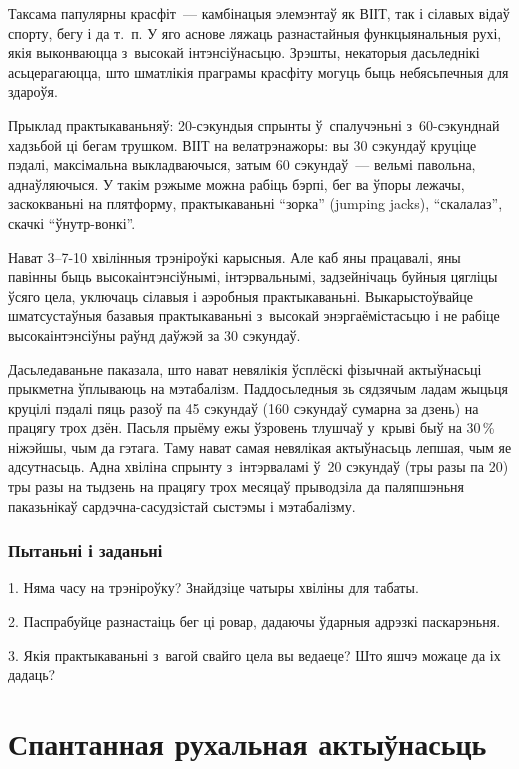 Таксама папулярны красфіт~--- камбінацыя элемэнтаў як ВІІТ, так і сілавых відаў спорту, бегу і да т.~п. У яго аснове ляжаць разнастайныя функцыянальныя рухі, якія выконваюцца з~высокай інтэнсіўнасьцю. Зрэшты, некаторыя дасьледнікі асьцерагаюцца, што шматлікія праграмы красфіту могуць быць небясьпечныя для здароўя.

Прыклад практыкаваньняў: 20-сэкундыя спрынты ў~спалучэньні з~60-сэкунднай хадзьбой ці бегам трушком. ВІІТ на велатрэнажоры: вы 30 сэкундаў круціце пэдалі, максімальна выкладваючыся, затым 60 сэкундаў~--- вельмі павольна, аднаўляючыся. У такім рэжыме можна рабіць бэрпі, бег ва ўпоры лежачы, заскокваньні на плятформу, практыкаваньні ``зорка'' (jumping jacks), ``скалалаз'', скачкі ``ўнутр-вонкі''.

Нават 3--7-10 хвілінныя трэніроўкі карысныя. Але каб яны працавалі, яны павінны быць высокаінтэнсіўнымі, інтэрвальнымі, задзейнічаць буйныя цягліцы ўсяго цела, уключаць сілавыя і аэробныя практыкаваньні. Выкарыстоўвайце шматсустаўныя базавыя практыкаваньні з~высокай энэргаёмістасьцю і не рабіце высокаінтэнсіўны раўнд даўжэй за 30 сэкундаў. 

Дасьледаваньне паказала, што нават невялікія ўсплёскі фізычнай актыўнасьці прыкметна ўплываюць на мэтабалізм. Паддосьледныя зь сядзячым ладам жыцьця круцілі пэдалі пяць разоў па 45 сэкундаў (160 сэкундаў сумарна за дзень) на працягу трох дзён. Пасьля прыёму ежы ўзровень тлушчаў у~крыві быў на 30\,\% ніжэйшы, чым да гэтага. Таму нават самая невялікая актыўнасьць лепшая, чым яе адсутнасьць. Адна хвіліна спрынту з~інтэрваламі ў~20 сэкундаў (тры разы па 20) тры разы на тыдзень на працягу трох месяцаў прыводзіла да паляпшэньня паказьнікаў сардэчна-сасудзістай сыстэмы і мэтабалізму.

\subsubsection{Пытаньні і заданьні}

1. Няма часу на трэніроўку? Знайдзіце чатыры хвіліны для табаты.

2. Паспрабуйце разнастаіць бег ці ровар, дадаючы ўдарныя адрэзкі паскарэньня.

3. Якія практыкаваньні з~вагой свайго цела вы ведаеце? Што яшчэ можаце да іх дадаць?


\section{Спантанная рухальная актыўнасьць}

